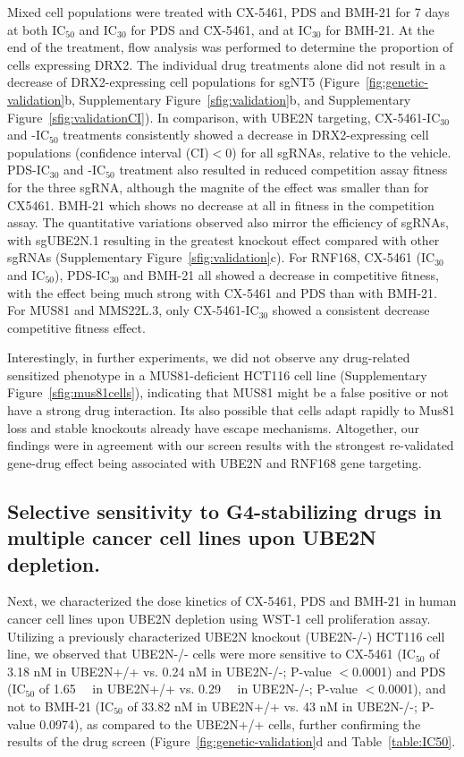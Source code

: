 Mixed cell populations were treated with CX-5461, PDS and BMH-21 for 7 days at both IC$_{50}$ and IC$_{30}$ for PDS and CX-5461, and at IC$_{30}$ for BMH-21. 
At the end of the treatment, flow analysis was performed to determine the proportion of cells expressing DRX2. 
The individual drug treatments alone did not result in a decrease of DRX2-expressing cell populations for sgNT5 (Figure~\ref{fig:genetic-validation}b, Supplementary Figure~\ref{sfig:validation}b, and Supplementary Figure~\ref{sfig:validationCI}). 
In comparison, with UBE2N targeting, CX-5461-IC$_{30}$ and -IC$_{50}$ treatments consistently showed a decrease in DRX2-expressing cell populations (confidence interval (CI)$<$0) for all sgRNAs, relative to the vehicle. 
PDS-IC$_{30}$ and -IC$_{50}$ treatment also resulted in reduced competition assay fitness for the three sgRNA, although the magnite of the effect was smaller than for CX5461.
BMH-21 which shows no decrease at all in fitness in the competition assay.
The quantitative variations observed also mirror the efficiency of sgRNAs, with sgUBE2N.1 resulting in the greatest knockout effect compared with other sgRNAs (Supplementary Figure~\ref{sfig:validation}c).
For RNF168, CX-5461 (IC$_{30}$ and IC$_{50}$), PDS-IC$_{30}$ and BMH-21 all showed a decrease in competitive fitness, with the effect being much strong with CX-5461 and PDS than with BMH-21. 
For MUS81 and MMS22L.3, only CX-5461-IC$_{30}$ showed a consistent decrease competitive fitness effect.

Interestingly, in further experiments, we did not observe any drug-related sensitized phenotype in a MUS81-deficient HCT116 cell line (Supplementary Figure~\ref{sfig:mus81cells}), indicating that MUS81 might be a false positive or not have a strong drug interaction. 
Its also possible that cells adapt rapidly to Mus81 loss and stable knockouts already have escape mechanisms. 
Altogether, our findings were in agreement with our screen results with the strongest re-validated gene-drug effect being associated with UBE2N and RNF168 gene targeting. 

\subsection{Selective sensitivity to G4-stabilizing drugs in multiple cancer cell lines upon UBE2N depletion.}
Next, we characterized the dose kinetics of CX-5461, PDS and BMH-21 in human cancer cell lines upon UBE2N depletion using WST-1 cell proliferation assay. 
Utilizing a previously characterized UBE2N knockout (UBE2N-/-) HCT116 cell line\cite{Thorslund2015}, we observed that UBE2N-/- cells were more sensitive to CX-5461 (IC$_{50}$ of 3.18 nM in UBE2N+/+ vs. 0.24 nM in UBE2N-/-; P-value $<$0.0001) and PDS (IC$_{50}$ of \SI{1.65}{\micro\Molar} in UBE2N+/+ vs. \SI{0.29}{\micro\Molar} in UBE2N-/-; P-value $<$0.0001), and not to BMH-21 (IC$_{50}$ of 33.82 nM in UBE2N+/+ vs. 43 nM in UBE2N-/-; P-value 0.0974), as compared to the UBE2N+/+ cells, further confirming the results of the drug screen (Figure~\ref{fig:genetic-validation}d and Table~\ref{table:IC50}.

